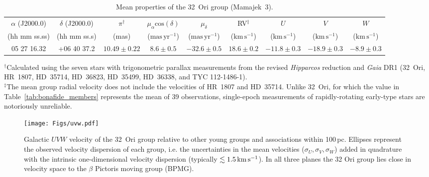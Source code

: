 \documentclass[usenatbib]{mnras}
\begin{document}
\begin{table*}
\caption[]{Mean properties of the 32~Ori group (Mamajek~3).}
\begin{tabular}{c c c c c c c c c}
\hline
$\alpha$ (J2000.0)   &   $\delta$ (J2000.0)   &   $\pi$$^{\dagger}$           &   $\mu_{\alpha} \mathrm{cos} (\delta)$   &   $\mu_{\delta}$                       &   RV$^{\ddag}$                            &   $U$                                     &   $V$                                      &   $W$   \\
(hh mm ss.ss)            &   (hh mm ss.s)             &   (mas)                      &   ($\mathrm{mas\,yr^{-1}}$)                       &   ($\mathrm{mas\,yr^{-1}}$)   &   ($\mathrm{km\,s^{-1}}$)   &   ($\mathrm{km\,s^{-1}}$)   &   ($\mathrm{km\,s^{-1}}$)   &   ($\mathrm{km\,s^{-1}}$)   \\
\hline
05 27 16.32               &   +06 40 37.2              &   $10.49\pm0.22$   &   $8.6\pm0.5$                                              &   $-32.6\pm0.5$                       &   $18.6\pm0.2$                     &   $-11.8\pm0.3$                   &   $-18.9\pm0.3$                  &   $-8.9\pm0.3$\\
\hline
\end{tabular}
\vspace{1pt}
\begin{flushleft}
%  
$^{\dagger}$Calculated using the seven stars with
trigonometric parallax measurements from the revised \emph{Hipparcos}
reduction and \emph{Gaia} DR1 (32~Ori, HR~1807, HD~35714, HD~36823,
HD~35499, HD~36338, and TYC 112-1486-1).\\
%
$^{\ddag}$The mean group radial velocity does not include the velocities
of HR~1807 and HD~35714. Unlike 32~Ori, for which the value in
Table~\ref{tab:bonafide_members} represents the mean of 39
observations, single-epoch measurements of rapidly-rotating early-type
stars are notoriously unreliable.
\end{flushleft}
\label{tab:group_mean}
\end{table*}

\begin{figure*}
\centering
\texttt{[image: Figs/uvw.pdf]}
\caption[]{Galactic $UVW$ velocity of the 32~Ori group relative to
  other young groups and associations within 100\,pc.  Ellipses
  represent the observed velocity dispersion of each group, i.e. the
  uncertainties in the mean velocities ($\sigma_{U}, \sigma_{V},
  \sigma_{W}$) added in quadrature with the intrinsic one-dimensional
  velocity dispersion (typically $\lesssim 1.5\,\rm{km\,s^{-1}}$). In
  all three planes the 32 Ori group lies close in velocity space to
  the $\beta$ Pictoris moving group (BPMG).}
\label{fig:uvw}
\end{figure*}
\end{document}
